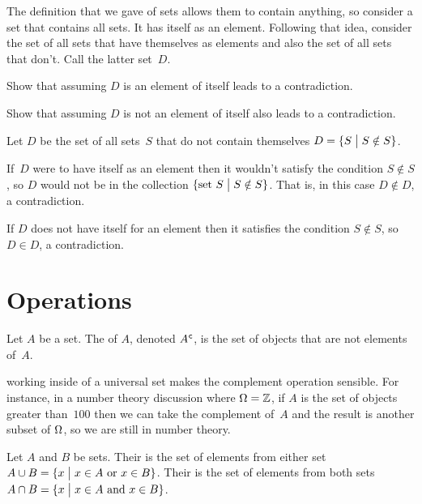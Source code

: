 \documentclass{test}  %
\begin{document}
\begin{ex} 
The definition that we gave of sets allows them to contain anything, so 
consider a set that contains all sets.
It has itself as an element.
Following that idea, 
consider the set of all sets that have themselves as elements and  
also the set of all sets that don't.
Call the latter set~$D$.
\begin{exes}
\item Show that assuming $D$ is an element of itself leads to a contradiction.
\item Show that assuming $D$ is not an element of itself also leads to a
contradiction.  
\end{exes}
\begin{ans}
Let $D$ be the set of all sets~$S$ that do not contain themselves
$D=\{S \bigm| S\notin S\}$.
\begin{exes}
\item If~$D$ were to have itself as an element 
  then it wouldn't satisfy the condition
  $S\notin S$, so $D$ would not be in the collection 
  $\{\text{set~$S$} \bigm| S\notin S\}$.
  That is, in this case $D\notin D$, a contradiction. 
\item If $D$ does not have itself for an element then it satisfies the
  condition $S\notin S$, so $D\in D$, a contradiction.
\end{exes}
\end{ans}
\end{ex}






\section{Operations}

\begin{df}
Let $A$ be a set.
The  of $A$, denoted ${A}^{\mspace{1mu}\mathsf{c}}$, is the 
set of objects that are not elements of~$A$.  
\end{df}

\noindent\remark
working inside of a universal set makes the complement
operation sensible. 
For instance, in a number theory discussion where $\Omega=\mathbb{Z}$, 
if $A$ is the set of objects greater than~$100$ then we can
take the complement of~$A$ and the result is another subset of 
$\Omega$, so 
we are still in number theory.

\begin{df}
Let $A$ and $B$ be sets.
Their  is the set of elements 
from either set 
$A\cup B=\{x \bigm| \text{$x\in A$ or $x\in B$}\}$.  
Their  is the set of elements 
from both sets
$A\cap B=\{x \bigm| \text{$x\in A$ and $x\in B$}\}$.  
\end{df}
\end{document}
